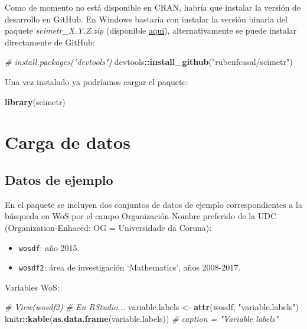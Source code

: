\documentclass[]{book}
\newenvironment{Shaded}{\begin{snugshade}}{\end{snugshade}}
\newcommand{\KeywordTok}[1]{\textcolor[rgb]{0.13,0.29,0.53}{\textbf{#1}}}
\newcommand{\StringTok}[1]{\textcolor[rgb]{0.31,0.60,0.02}{#1}}
\newcommand{\CommentTok}[1]{\textcolor[rgb]{0.56,0.35,0.01}{\textit{#1}}}
\newcommand{\OperatorTok}[1]{\textcolor[rgb]{0.81,0.36,0.00}{\textbf{#1}}}
\newcommand{\NormalTok}[1]{#1}
\begin{document}
Como de momento no está disponible en CRAN, habría que instalar la
versión de desarrollo en GitHub. En Windows bastaría con instalar la
versión binaria del paquete \emph{scimetr\_X.Y.Z.zip} (disponible
\href{https://github.com/rubenfcasal/scimetr/tree/master/docs}{aqui}),
alternativamente se puede instalar directamente de GitHub:

\begin{Shaded}
\begin{Highlighting}[]
\CommentTok{# install.packages("devtools")}
\NormalTok{devtools}\OperatorTok{::}\KeywordTok{install_github}\NormalTok{(}\StringTok{"rubenfcasal/scimetr"}\NormalTok{)}
\end{Highlighting}
\end{Shaded}

Una vez instalado ya podríamos cargar el paquete:

\begin{Shaded}
\begin{Highlighting}[]
\KeywordTok{library}\NormalTok{(scimetr)}
\end{Highlighting}
\end{Shaded}

\section{Carga de datos}\label{carga-de-datos}

\subsection{Datos de ejemplo}\label{datos-de-ejemplo-1}

En el paquete se incluyen dos conjuntos de datos de ejemplo
correspondientes a la búsqueda en WoS por el campo Organización-Nombre
preferido de la UDC (Organization-Enhaced: OG = Universidade da Coruna):

\begin{itemize}
\item
  \texttt{wosdf}: año 2015.
\item
  \texttt{wosdf2}: área de investigación `Mathematics', años 2008-2017.
\end{itemize}

Variables WoS:

\begin{Shaded}
\begin{Highlighting}[]
\CommentTok{# View(wosdf2) # En RStudio...}
\NormalTok{variable.labels <-}\StringTok{ }\KeywordTok{attr}\NormalTok{(wosdf, }\StringTok{"variable.labels"}\NormalTok{)}
\NormalTok{knitr}\OperatorTok{::}\KeywordTok{kable}\NormalTok{(}\KeywordTok{as.data.frame}\NormalTok{(variable.labels)) }\CommentTok{# caption = "Variable labels"}
\end{Highlighting}
\end{Shaded}
\end{document}
